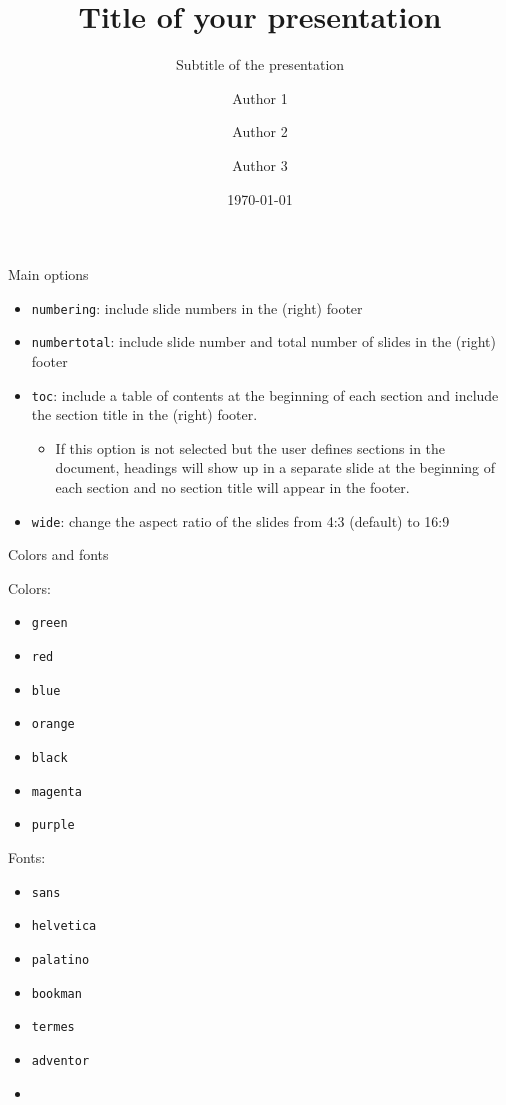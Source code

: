 \documentclass[numbertotal,toc,wide]{bpslides}
\title{Title of your presentation}
\subtitle{Subtitle of the presentation}
\author{Author 1\inst{1} \and Author 2\inst{2} \and Author 3\inst{3}}
\institute{\inst{1} Institution 1, \  \inst{2} Institution 2, \  \inst{3} Institution 3}
\date{\today}
\begin{document}
\begin{frame}[plain]
	\titlepage
\end{frame}

\begin{frame}{Main options}\label{firstslide}
	\begin{itemize}
		\item \texttt{numbering}: include slide numbers in the (right) footer
		\item \texttt{numbertotal}: include slide number and total number of slides in the (right) footer
		\item \texttt{toc}: include a table of contents at the beginning of each section and include the section title in the (right) footer.
		\begin{itemize}
			\item If this option is not selected but the user defines sections in the document, headings will show up in a separate slide at the beginning of each section and no section title will appear in the footer.
		\end{itemize}
		\item \texttt{wide}: change the aspect ratio of the slides from 4:3 (default) to 16:9
	\end{itemize}
\end{frame}

\begin{frame}{Colors and fonts}
	\hfill
	\begin{minipage}{0.3\textwidth}
		Colors:
		\begin{itemize}
			\item {\color{green0}\texttt{green}} 
			\item {\color{red0}\texttt{red}}
			\item {\color{blue0}\texttt{blue}}
			\item {\color{orange0}\texttt{orange}}
			\item {\color{black}\texttt{black}}
			\item {\color{magenta0}\texttt{magenta}}
			\item {\color{purple0}\texttt{purple}}
		\end{itemize}
	\end{minipage}
	\begin{minipage}{0.3\textwidth}
		Fonts:
		\begin{itemize}
			\item \texttt{sans} 
			\item \texttt{helvetica}
			\item \texttt{palatino}
			\item \texttt{bookman}
			\item \texttt{termes}
			\item \texttt{adventor}
			\item[]
		\end{itemize}
	\end{minipage}
	\hfill \ 
\end{frame}
\end{document}
